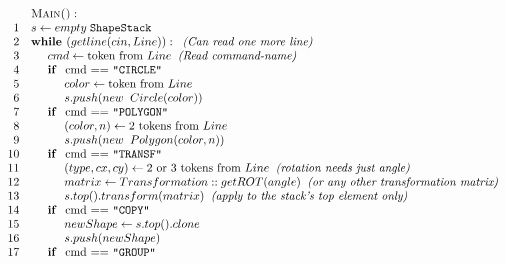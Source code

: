 \documentclass[11pt]{article}
\begin{document}
\[
\begin{array}{rl}
 & \text{\textsc{Main()}}:\\
1 & s \leftarrow empty\;\mathtt{ShapeStack}\\
2 & \text{\textbf{while\ }} (getline( cin, Line)):\;\;\text{\em (Can read one more line)}\\
3 & \hspace{.5cm} cmd \leftarrow \text{token from $Line$}\;\;\text{\em (Read command-name)}\\
4 & \hspace{.5cm} \text{\textbf{if\ } cmd == {\tt "CIRCLE"}}\\
5 & \hspace{1.0cm} color \leftarrow \text{token from $Line$}\\
6 & \hspace{1.0cm} s.push(new\;\;Circle(color))\\
7 & \hspace{.5cm} \text{\textbf{if\ } cmd == {\tt "POLYGON"}}\\
8 & \hspace{1.0cm} (color,n) \leftarrow \text{$2$ tokens from $Line$}\\
9 & \hspace{1.0cm} s.push(new\;\;Polygon(color,n))\\
10 & \hspace{.5cm} \text{\textbf{if\ } cmd == {\tt "TRANSF"}}\\
11 & \hspace{1.0cm} (type,cx,cy) \leftarrow \text{$2$ or $3$ tokens from $Line$}\;\;\text{\em (rotation needs just angle)}\\
12 & \hspace{1.0cm} matrix \leftarrow Transformation::getROT(angle)\;\;\text{\em (or any other transformation matrix)}\\
13 & \hspace{1.0cm} s.top().transform(matrix)\;\;\text{\em (apply to the stack's top element only)}\\
14 & \hspace{0.5cm} \text{\textbf{if\ } cmd == {\tt "COPY"}}\\
15 & \hspace{1.0cm} newShape \leftarrow s.top().clone\\
16 & \hspace{1.0cm} s.push(newShape)\\
17 & \hspace{0.5cm} \text{\textbf{if\ } cmd == {\tt "GROUP"}}\\

\end{array}\]
\end{document}
